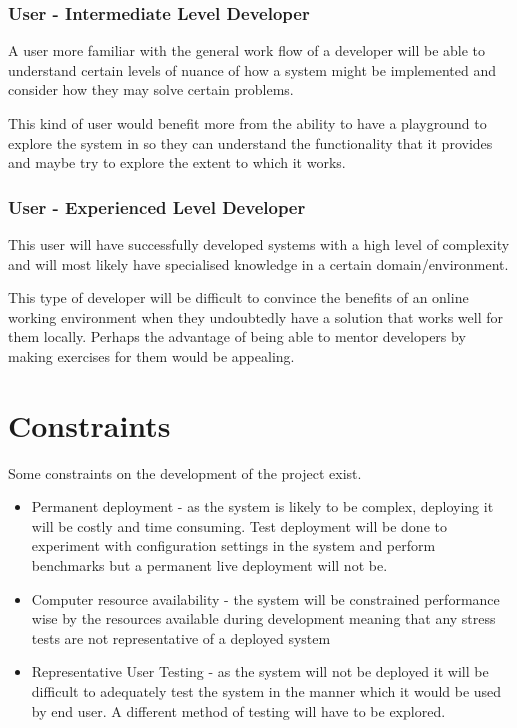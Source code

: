 \subsubsection{User - Intermediate Level Developer}
A user more familiar with the general work flow of a developer will be able to understand certain levels of nuance of how a system might be implemented and consider how they may solve certain problems.

This kind of user would benefit more from the ability to have a playground to explore the system in so they can understand the functionality that it provides and maybe try to explore the extent to which it works.

\subsubsection{User - Experienced Level Developer}
This user will have successfully developed systems with a high level of complexity and will most likely have specialised knowledge in a certain domain/environment.

This type of developer will be difficult to convince the benefits of an online working environment when they undoubtedly have a solution that works well for them locally. Perhaps the advantage of being able to mentor developers by making exercises for them would be appealing.

\section{Constraints} \label{section:probart-constraints}
Some constraints on the development of the project exist.

\begin{itemize}
    \item Permanent deployment - as the system is likely to be complex, deploying it will be costly and time consuming. Test deployment will be done to experiment with configuration settings in the system and perform benchmarks but a permanent live deployment will not be.
    \item Computer resource availability - the system will be constrained performance wise by the resources available during development meaning that any stress tests are not representative of a deployed system
    \item Representative User Testing - as the system will not be deployed it will be difficult to adequately test the system in the manner which it would be used by end user. A different method of testing will have to be explored.
\end{itemize}


